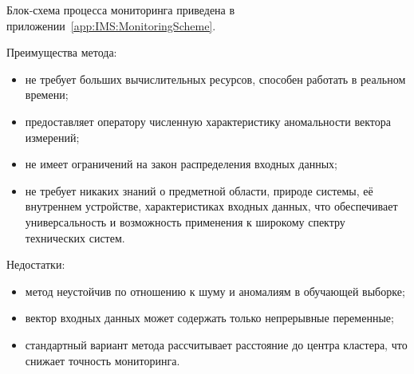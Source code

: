 Блок-схема процесса мониторинга приведена в приложении~\ref{app:IMS:MonitoringScheme}.

Преимущества метода:
\begin{itemize}
	\item не требует больших вычислительных ресурсов, способен работать в реальном времени;
	\item предоставляет оператору численную характеристику аномальности вектора измерений;
	\item не имеет ограничений на закон распределения входных данных;
	\item не требует никаких знаний о предметной области, природе системы, её внутреннем устройстве, характеристиках входных данных, что обеспечивает универсальность и возможность применения к широкому спектру технических систем.
\end{itemize}

Недостатки:
\begin{itemize}
	\item метод неустойчив по отношению к шуму и аномалиям в обучающей выборке; 
	\item вектор входных данных может содержать только непрерывные переменные;
	\item стандартный вариант метода рассчитывает расстояние до центра кластера, что снижает точность мониторинга.
\end{itemize}